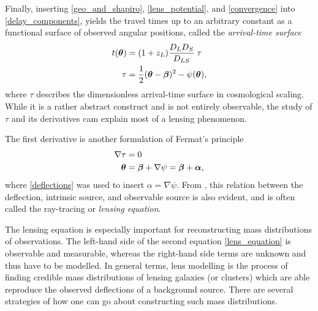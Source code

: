 Finally, inserting \eqref{geo_and_shapiro}, \eqref*{lens_potential}, and
\eqref*{convergence} into \eqref{delay_components}, yields the travel times up
to an arbitrary constant as a functional surface of observed angular positions,
called the \textit{arrival-time surface}
%
%
\begin{equation}\eqlbl{arrival_time_surface}%
  \begin{aligned}%
    t(\bm\theta) &= (1+z_{L})\frac{D_{L}D_{S}}{D_{LS}}\;\tau \\
    \tau &= \frac{1}{2}(\bm\theta-\bm\beta)^{2} - \psi(\bm\theta),
  \end{aligned}%
\end{equation}%
%
where $\tau$ describes the dimensionless arrival-time surface in cosmological
scaling. While it is a rather abstract construct and is not entirely observable, the study of
$\tau$ and its derivatives cam explain most of a lensing phenomenon.

The first derivative is another formulation of Fermat's principle
%
\begin{equation}\eqlbl{lens_equation}%
  \begin{aligned}%
    \nabla\tau &= 0 \\
    \bm\theta &= \bm\beta + \nabla\psi = \bm\beta + \bm\alpha,
  \end{aligned}%
\end{equation}%
%
where \eqref{deflections} was used to insert $\alpha = \nabla\psi$.  From
, this relation between the deflection, intrinsic source, and
observable source is also evident, and is often called the ray-tracing or
\textit{lensing equation}. 

The lensing equation is especially important for reconstructing mass
distributions of observations.  The left-hand side of the second equation
\eqref*{lens_equation} is observable and measurable, whereas the right-hand side
terms are unknown and thus have to be modelled.  In general terms, lens
modelling is the process of finding credible mass distributions of lensing
galaxies (or clusters) which are able reproduce the observed deflections of a
background source.  There are several strategies of how one can go about
constructing such mass distributions.  

